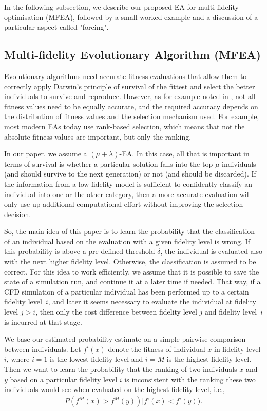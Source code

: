 In the following subsection, we describe our proposed EA for multi-fidelity optimisation (MFEA), followed by a small worked example and a discussion of a particular aspect called "forcing".

\subsection{Multi-fidelity Evolutionary Algorithm (MFEA)}
Evolutionary algorithms need accurate fitness evaluations that allow them to correctly apply Darwin's principle of survival of the fittest and select the better individuals to survive and reproduce. However, as for example noted in \cite{SBC06,Runarsson04}, not all fitness values need to be equally accurate, and the required accuracy depends on the distribution of fitness values and the selection mechanism used.
For example, most modern EAs today use rank-based selection, which means that not the absolute fitness values are important, but only the ranking.

In our paper, we assume a $(\mu+\lambda)$-EA. In this case, all that is important in terms of survival is whether a particular solution falls into the top $\mu$ individuals (and should survive to the next generation) or not (and should be discarded).
If the information from a low fidelity model is sufficient to confidently classify an individual into one or the other category, then a more accurate evaluation will only use up additional computational effort without improving the selection decision.

So, the main idea of this paper is to learn the probability that the classification of an individual based on the evaluation with a given fidelity level is wrong. If this probability is above a pre-defined threshold $\delta$, the individual is evaluated also with the next higher fidelity level. Otherwise, the classification is assumed to be correct.
For this idea to work efficiently, we assume that it is possible to save the state of a simulation run, and continue it at a later time if needed. That way, if a CFD simulation of a particular individual has been performed up to a certain fidelity level~$i$, and later it seems necessary to evaluate the individual at fidelity level $j>i$, then only the cost difference between fidelity level $j$ and fidelity level~$i$ is incurred at that stage.

We base our estimated probability estimate on a simple pairwise comparison between individuals. Let $f^i(x)$ denote the fitness of individual $x$ in fidelity level $i$, where $i=1$ is the lowest fidelity level and $i=M$ is the highest fidelity level. Then we want to learn the probability that the ranking of two individuals $x$ and $y$ based on a particular fidelity level $i$ is inconsistent with the ranking these two individuals would see when evaluated on the highest fidelity level, i.e., 
\begin{eqnarray}
P(f^M(x)>f^M(y))|f^i(x)<f^i(y)).
\end{eqnarray}

